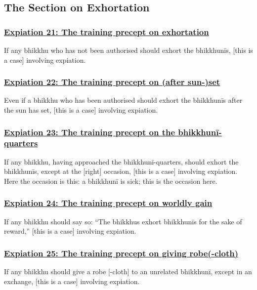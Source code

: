 \setsubsecheadstyle{\subsectionFmt}
\subsection{The Section on Exhortation}
\label{exp-vagga3}

\subsubsection*{\hyperref[pac21]{Expiation 21: The training precept on exhortation}}
\label{exp21}
If any bhikkhu who has not been authorised should exhort the bhikkhunīs, [this is a case] involving expiation.



\subsubsection*{\hyperref[pac22]{Expiation 22: The training precept on (after sun-)set}}
\label{exp22}
Even if a bhikkhu who has been authorised should exhort the bhikkhunīs after the sun has set, [this is a case] involving expiation.



\subsubsection*{\hyperref[pac23]{Expiation 23: The training precept on the bhikkhunī-quarters}}
\label{exp23}
If any bhikkhu, having approached the bhikkhunī-quarters, should exhort the bhikkhunīs, except at the [right] occasion, [this is a case] involving expiation. Here the occasion is this: a bhikkhunī is sick; this is the occasion here.



\subsubsection*{\hyperref[pac24]{Expiation 24: The training precept on worldly gain}}
\label{exp24}
If any bhikkhu should say so: ``The bhikkhus exhort bhikkhunīs for the sake of reward,'' [this is a case] involving expiation.



\subsubsection*{\hyperref[pac25]{Expiation 25: The training precept on giving robe(-cloth)}}
\label{exp25}
If any bhikkhu should give a robe [-cloth] to an unrelated bhikkhunī, except in an exchange, [this is a case] involving expiation.



